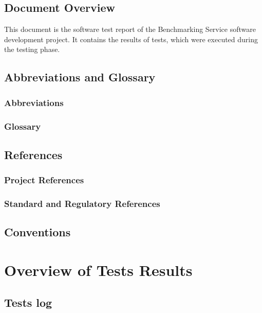 \documentclass[runningheads,a4paper]{article}
\begin{document}
	\subsection{Document Overview}
		This document is the software test report of the Benchmarking Service software development project. It contains the results of tests, which were executed during the testing phase.

	\subsection{Abbreviations and Glossary}
		\subsubsection{Abbreviations}

		\subsubsection{Glossary}

	\subsection{References}
		\subsubsection{Project References}

		\subsubsection{Standard and Regulatory References}

	\subsection{Conventions}

\section{Overview of Tests Results}
	\subsection{Tests log}
\end{document}
